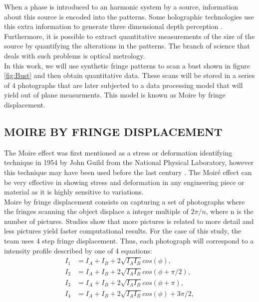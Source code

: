 \label{sec:TEO_FRAMEWORK}
When a phase is introduced to an harmonic system by a source, information about this source is encoded into the patterns. Some holographic technologies use this extra information to generate three dimensional depth perception \cite{gaasvik2003optical}. Furthermore, it is possible to extract quantitative measurements of the size of the source by quantifying the alterations in the patterns. The branch of science that deals with such problems is optical metrology\cite{Zhang:07}. \\

In this work, we will use synthetic fringe patterns to scan a bust shown in figure \ref{fig:Bust} and then obtain quantitative data. These scans will be stored in a series of 4 photographs that are later subjected to a data processing model that will yield out of plane measurments. This model is known as Moire by fringe displacement. 

\subsection{MOIRE BY FRINGE DISPLACEMENT}
The Moire effect was first mentioned as a stress or deformation identifying technique in 1954 by John Guild from the National Physical Laboratory, however this technique may have been used before the last century \cite{creath1992moire}. The Moiré effect can be very effective in showing stress and deformation in any engineering piece or material as it is highly sensitive to variations. \\ 

Moire by fringe displacement consists on capturing a set of photographs where the fringes scanning the object displace a integer multiple of $2\pi/n$, where n is the number of pictures. Studies \cite{creath1992moire} show that more pictures is related to more detail and less pictures yield faster computational results. For the case of this study, the team uses 4 step fringe displacement. Thus, each photograph will correspond to a intensity profile described by one of 4 equations:
\begin{align}
    I_1 &= I_A + I_B + 2\sqrt{I_AI_B} cos(\phi),\\
    I_2 &= I_A + I_B + 2\sqrt{I_AI_B} cos(\phi + \pi/2),\\
    I_3 &= I_A + I_B + 2\sqrt{I_AI_B} cos(\phi + \pi),\\
    I_4 &= I_A + I_B + 2\sqrt{I_AI_B} cos(\phi) + 3\pi/2,
    \label{eq:system_of_I}
\end{align}
 
